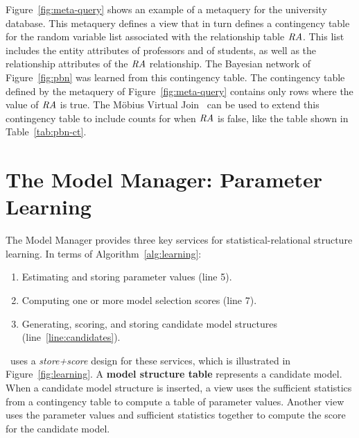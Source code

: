 Figure~\ref{fig:meta-query} shows an example of a metaquery for the university database. This metaquery defines a view that in turn defines a contingency table for the random variable list associated with the relationship table $\mathit{RA}$. This list includes the entity attributes of professors and of students, as well as the relationship attributes of the $\mathit{RA}$ relationship. 
The Bayesian network of Figure~\ref{fig:pbn} was learned from this contingency table. 
The  contingency table defined by the metaquery of Figure~\ref{fig:meta-query} contains only rows where the value of $\mathit{RA}$ is true. The M\"obius Virtual Join~\cite{Qian2014a} can be used to extend this contingency table to include counts for when $\mathit{RA}$ is false, like the table shown in Table~\ref{tab:pbn-ct}.

\section{The Model Manager: Parameter Learning} \label{sec:model-manager}

The Model Manager provides three key services for statistical-relational structure learning. In terms of Algorithm~\ref{alg:learning}: 

\begin{enumerate}
\item  Estimating and storing parameter values (line 5).
\item Computing one or more model selection scores (line 7).
\item Generating, scoring, and storing candidate model structures (line~\ref{line:candidates}).
\end{enumerate}

\FB\ uses a {\em store+score} design for these services, which is illustrated in 
Figure~\ref{fig:learning}. 
A \textbf{model structure table} represents a candidate model. When a candidate model structure is inserted, a view uses the sufficient statistics from a contingency table to compute a table of parameter values. Another view uses the parameter values and sufficient statistics together to compute the score for the candidate model. 

